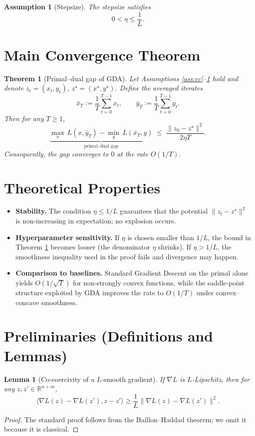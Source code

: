 \documentclass{article}
\newtheorem{theorem}{Theorem}
\newtheorem{lemma}{Lemma}
\newtheorem{assumption}{Assumption}
\begin{document}
\begin{assumption}[Stepsize]\label{ass:stepsize}
The stepsize satisfies
\[
0<\eta\le\frac{1}{L}.
\]
\end{assumption}

\section*{Main Convergence Theorem}
\begin{theorem}[Primal–dual gap of GDA]\label{thm:gap}
Let Assumptions \ref{ass:cc}–\ref{ass:stepsize} hold and denote $z_{t}=(x_{t},y_{t})$, $z^{\star}=(x^{\star},y^{\star})$.
Define the averaged iterates
\[
\bar{x}_{T}:=\frac{1}{T}\sum_{t=0}^{T-1}x_{t},\qquad
\bar{y}_{T}:=\frac{1}{T}\sum_{t=0}^{T-1}y_{t}.
\]
Then for any $T\ge1$,
\[
\underbrace{\max_{x}\,L(x,\bar{y}_{T})-\min_{y}\,L(\bar{x}_{T},y)}_{\displaystyle\text{primal–dual gap}}
\;\le\;
\frac{\|z_{0}-z^{\star}\|^{2}}{2\eta T}.
\]
Consequently, the gap converges to $0$ at the rate $O(1/T)$.
\end{theorem}

\section*{Theoretical Properties}
\begin{itemize}
\item \textbf{Stability.} The condition $\eta\le 1/L$ guarantees that the potential
$\|z_{t}-z^{\star}\|^{2}$ is non‑increasing in expectation; no explosion occurs.
\item \textbf{Hyperparameter sensitivity.}
If $\eta$ is chosen smaller than $1/L$, the bound in Theorem \ref{thm:gap} becomes looser (the denominator $\eta$ shrinks). If $\eta>1/L$, the smoothness inequality used in the proof fails and divergence may happen.
\item \textbf{Comparison to baselines.}
Standard Gradient Descent on the primal alone yields $O(1/\sqrt{T})$ for non‑strongly convex functions, while the saddle‑point structure exploited by GDA improves the rate to $O(1/T)$ under convex–concave smoothness.
\end{itemize}

\section*{Preliminaries (Definitions and Lemmas)}
\begin{lemma}[Co‑coercivity of a $L$‑smooth gradient]\label{lem:coerc}
If $\nabla L$ is $L$‑Lipschitz, then for any $z,z'\in\mathbb{R}^{n+m}$,
\[
\langle \nabla L(z)-\nabla L(z'),z-z'\rangle\ge\frac{1}{L}\|\nabla L(z)-\nabla L(z')\|^{2}.
\]
\end{lemma}
\begin{proof}
The standard proof follows from the Baillon–Haddad theorem; we omit it because it is classical.
\end{proof}
\end{document}

